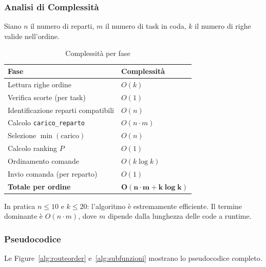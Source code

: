 \subsubsection*{Analisi di Complessità}

Siano $n$ il numero di reparti, $m$ il numero di task in coda, $k$ il numero di
righe valide nell'ordine.

\begin{table}[H]
\centering
\caption{Complessità per fase}
\label{tab:complessita}
\begin{tabular}{ll}
\toprule
\textbf{Fase} & \textbf{Complessità} \\
\midrule
Lettura righe ordine                   & $O(k)$ \\
Verifica scorte (per task)             & $O(1)$ \\
Identificazione reparti compatibili    & $O(n)$ \\
Calcolo \texttt{carico\_reparto}       & $O(n \cdot m)$ \\
Selezione $\min(\text{carico})$        & $O(n)$ \\
Calcolo ranking $P$                    & $O(1)$ \\
Ordinamento comande                    & $O(k \log k)$ \\
Invio comanda (per reparto)            & $O(1)$ \\
\midrule
\textbf{Totale per ordine}             & $\boldsymbol{O(n \cdot m + k \log k)}$ \\
\bottomrule
\end{tabular}
\end{table}

In pratica $n \leq 10$ e $k \leq 20$: l'algoritmo è estremamente efficiente. Il
termine dominante è $O(n \cdot m)$, dove $m$ dipende dalla lunghezza delle code a
runtime.

\subsubsection*{Pseudocodice}

Le Figure~\ref{alg:routeorder} e~\ref{alg:subfunzioni} mostrano lo pseudocodice
completo.

